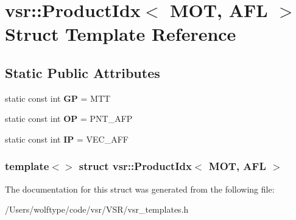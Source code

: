 \hypertarget{structvsr_1_1_product_idx_3_01_m_o_t_00_01_a_f_l_01_4}{\section{vsr\-:\-:Product\-Idx$<$ M\-O\-T, A\-F\-L $>$ Struct Template Reference}
\label{structvsr_1_1_product_idx_3_01_m_o_t_00_01_a_f_l_01_4}
}
\subsection*{Static Public Attributes}
\begin{DoxyCompactItemize}
\item 
\hypertarget{structvsr_1_1_product_idx_3_01_m_o_t_00_01_a_f_l_01_4_ab13683195708d0e6e0695b5a1ea51ebd}{static const int {\bfseries G\-P} = M\-T\-T}\label{structvsr_1_1_product_idx_3_01_m_o_t_00_01_a_f_l_01_4_ab13683195708d0e6e0695b5a1ea51ebd}

\item 
\hypertarget{structvsr_1_1_product_idx_3_01_m_o_t_00_01_a_f_l_01_4_a4e6a329c29e5cd430fe49b8286ec7ed9}{static const int {\bfseries O\-P} = P\-N\-T\-\_\-\-A\-F\-P}\label{structvsr_1_1_product_idx_3_01_m_o_t_00_01_a_f_l_01_4_a4e6a329c29e5cd430fe49b8286ec7ed9}

\item 
\hypertarget{structvsr_1_1_product_idx_3_01_m_o_t_00_01_a_f_l_01_4_a7fee353254b6ee6d27de790d1ef5e28c}{static const int {\bfseries I\-P} = V\-E\-C\-\_\-\-A\-F\-F}\label{structvsr_1_1_product_idx_3_01_m_o_t_00_01_a_f_l_01_4_a7fee353254b6ee6d27de790d1ef5e28c}

\end{DoxyCompactItemize}
\subsubsection*{template$<$$>$ struct vsr\-::\-Product\-Idx$<$ M\-O\-T, A\-F\-L $>$}



The documentation for this struct was generated from the following file\-:\begin{DoxyCompactItemize}
\item 
/\-Users/wolftype/code/vsr/\-V\-S\-R/vsr\-\_\-templates.\-h\end{DoxyCompactItemize}

